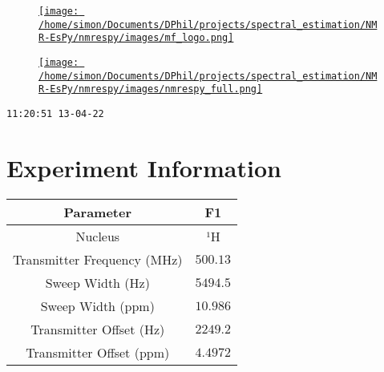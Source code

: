 \documentclass[8pt]{article}
\begin{document}
\begin{figure}[!ht]
\begin{minipage}[b][2.5cm][c]{.72\textwidth}
\href{http://foroozandeh.chem.ox.ac.uk/home}%
{\texttt{[image: /home/simon/Documents/DPhil/projects/spectral\_estimation/NMR-EsPy/nmrespy/images/mf\_logo.png]}}
\end{minipage}
\begin{minipage}[b][2.5cm][c]{.27\textwidth}
\href{https://foroozandehgroup.github.io/NMR-EsPy}%
{\texttt{[image: /home/simon/Documents/DPhil/projects/spectral\_estimation/NMR-EsPy/nmrespy/images/nmrespy\_full.png]}}
\end{minipage}
\end{figure}
\texttt{11:20:51 13-04-22}



\section*{Experiment Information}
\begin{longtable}[l]{c c}
\toprule
Parameter & F1\\
\midrule
Nucleus & ¹H\\
Transmitter Frequency (MHz) & $\num{500.13}$\\
Sweep Width (Hz) & $\num{5494.5}$\\
Sweep Width (ppm) & $\num{10.986}$\\
Transmitter Offset (Hz) & $\num{2249.2}$\\
Transmitter Offset (ppm) & $\num{4.4972}$\\
\bottomrule
\end{longtable}
\end{document}
